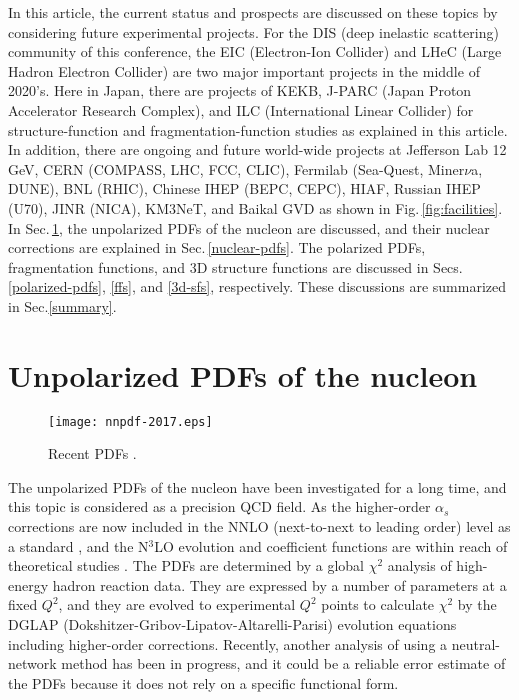 \documentclass{PoS}
\begin{document}
In this article, the current status and prospects are
discussed on these topics by considering future experimental projects.
For the DIS (deep inelastic scattering) community of this conference, 
the EIC (Electron-Ion Collider) and LHeC (Large Hadron Electron Collider)
are two major important projects in the middle of 2020's.
Here in Japan, there are projects of KEKB, 
J-PARC (Japan Proton Accelerator Research Complex), and
ILC (International Linear Collider) for structure-function 
and fragmentation-function studies as explained in this article.
In addition, there are ongoing and future world-wide projects at
Jefferson Lab 12 GeV, CERN (COMPASS, LHC, FCC, CLIC),
Fermilab (Sea-Quest, Miner$\nu$a, DUNE), BNL (RHIC), Chinese IHEP (BEPC, CEPC),
HIAF, Russian IHEP (U70), JINR (NICA), KM3NeT, and Baikal GVD
as shown in Fig.\,\ref{fig:facilities}.
In Sec.\,\ref{unpol-pdfs}, the unpolarized PDFs of the nucleon are
discussed, and their nuclear corrections are explained 
in Sec.\,\ref{nuclear-pdfs}. The polarized PDFs,
fragmentation functions, and 3D structure functions 
are discussed in Secs.\,\ref{polarized-pdfs}, \ref{ffs}, and 
\ref{3d-sfs}, respectively. These discussions are summarized 
in Sec.\ref{summary}.

\section{Unpolarized PDFs of the nucleon}
\label{unpol-pdfs}

\begin{wrapfigure}[13]{r}{0.30\textwidth}
   \vspace{-0.8cm} 
   \begin{center}
     \texttt{[image: nnpdf-2017.eps]}
   \end{center}
\vspace{-0.85cm}
\caption{Recent PDFs \cite{unpol-pdfs}.}
\label{fig:nnpdfs}
\vspace{-0.5cm}
\end{wrapfigure}

The unpolarized PDFs of the nucleon have been investigated 
for a long time, and this topic is considered as 
a precision QCD field. 
As the higher-order $\alpha_s$ corrections are now included
in the NNLO (next-to-next to leading order) level as a standard
\cite{unpol-pdfs}, and the N$^3$LO evolution and coefficient functions 
are within reach of theoretical studies \cite{n3lo}.
The PDFs are determined by a global $\chi^2$ analysis of high-energy 
hadron reaction data. They are expressed by a number of parameters
at a fixed $Q^2$, and they are evolved to experimental $Q^2$ points
to calculate $\chi^2$ by the DGLAP 
(Dokshitzer-Gribov-Lipatov-Altarelli-Parisi) evolution equations
including higher-order corrections. Recently, another analysis
of using a neutral-network method has been in progress, and 
it could be a reliable error estimate of the PDFs because 
it does not rely on a specific functional form. 
\end{document}
